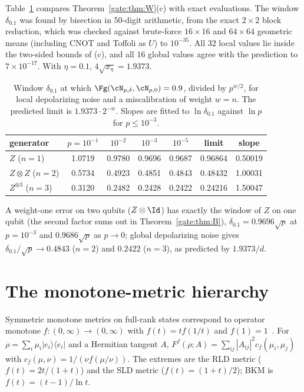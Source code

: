 Table~\ref{gate:tab:Swindow} compares Theorem~\ref{gate:thm:W}(c) with exact evaluations. The window $\delta_{0.1}$ was found by bisection in 50-digit arithmetic, from the exact $2\times2$ block reduction, which was checked against brute-force $16\times16$ and $64\times64$ geometric means (including CNOT and Toffoli as $U$) to $10^{-35}$. All $32$ local values lie inside the two-sided bounds of (c), and all $16$ global values agree with the prediction to $7\times10^{-17}$. With $\eta=0.1$, $4\sqrt{x_\eta}=1.9373$.

\begin{table}[!tbp]
\centering
\caption{Window $\delta_{0.1}$ at which $\Fg(\cN_{p,\delta},\cN_{p,0})=0.9$, divided by $p^{w/2}$, for local depolarizing noise and a miscalibration of weight $w=n$. The predicted limit is $1.9373\cdot2^{-w}$. Slopes are fitted to $\ln\delta_{0.1}$ against $\ln p$ for $p\le10^{-3}$.}
\label{gate:tab:Swindow}
\begin{tabular}{lcccccc}
\toprule
generator & $p=10^{-1}$ & $10^{-2}$ & $10^{-3}$ & $10^{-5}$ & limit & slope\\
\midrule
$Z$ ($n=1$) & 1.0719 & 0.9780 & 0.9696 & 0.9687 & 0.96864 & 0.50019\\
$Z\otimes Z$ ($n=2$) & 0.5734 & 0.4923 & 0.4851 & 0.4843 & 0.48432 & 1.00031\\
$Z^{\otimes3}$ ($n=3$) & 0.3120 & 0.2482 & 0.2428 & 0.2422 & 0.24216 & 1.50047\\
\bottomrule
\end{tabular}
\end{table}

A weight-one error on two qubits ($Z\otimes\Id$) has exactly the window of $Z$ on one qubit (the second factor sums out in Theorem~\ref{gate:thm:B}), $\delta_{0.1}=0.9696\sqrt p$ at $p=10^{-3}$ and $0.9686\sqrt p$ as $p\to0$; global depolarizing noise gives $\delta_{0.1}/\sqrt p\to0.4843$ ($n=2$) and $0.2422$ ($n=3$), as predicted by $1.9373/d$.

\section{The monotone-metric hierarchy}\label{gate:sec:hier}

Symmetric monotone metrics on full-rank states correspond to operator monotone $f:(0,\infty)\to(0,\infty)$ with $f(t)=tf(1/t)$ and $f(1)=1$~\cite{Petz1996}. For $\rho=\sum_i\mu_i|e_i\rangle\langle e_i|$ and a Hermitian tangent $A$, $F^f(\rho;A)=\sum_{ij}|A_{ij}|^2c_f(\mu_i,\mu_j)$ with $c_f(\mu,\nu)=1/(\nu f(\mu/\nu))$. The extremes are the RLD metric ($f(t)=2t/(1+t)$) and the SLD metric ($f(t)=(1+t)/2$); BKM is $f(t)=(t-1)/\ln t$.


